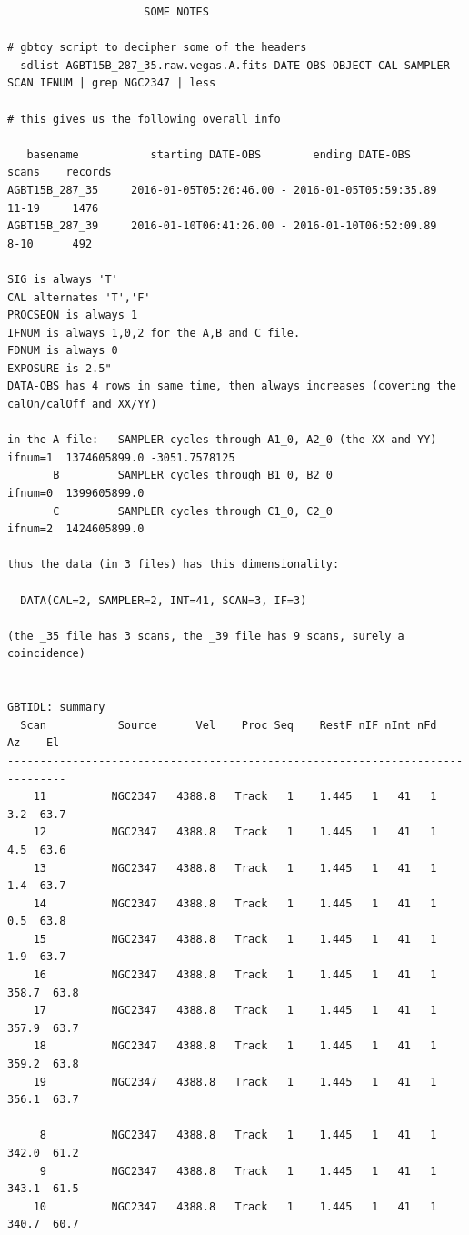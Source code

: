 \documentclass[12pt,a4paper]{article}
\begin{document}
\footnotesize
\begin{verbatim}
                     SOME NOTES
 
# gbtoy script to decipher some of the headers
  sdlist AGBT15B_287_35.raw.vegas.A.fits DATE-OBS OBJECT CAL SAMPLER SCAN IFNUM | grep NGC2347 | less

# this gives us the following overall info

   basename           starting DATE-OBS        ending DATE-OBS       scans    records
AGBT15B_287_35     2016-01-05T05:26:46.00 - 2016-01-05T05:59:35.89   11-19     1476
AGBT15B_287_39     2016-01-10T06:41:26.00 - 2016-01-10T06:52:09.89    8-10      492

SIG is always 'T'
CAL alternates 'T','F'
PROCSEQN is always 1
IFNUM is always 1,0,2 for the A,B and C file.
FDNUM is always 0
EXPOSURE is 2.5"
DATA-OBS has 4 rows in same time, then always increases (covering the calOn/calOff and XX/YY) 

in the A file:   SAMPLER cycles through A1_0, A2_0 (the XX and YY) - ifnum=1  1374605899.0 -3051.7578125
       B         SAMPLER cycles through B1_0, B2_0                   ifnum=0  1399605899.0
       C         SAMPLER cycles through C1_0, C2_0                   ifnum=2  1424605899.0

thus the data (in 3 files) has this dimensionality:

  DATA(CAL=2, SAMPLER=2, INT=41, SCAN=3, IF=3)

(the _35 file has 3 scans, the _39 file has 9 scans, surely a coincidence)


GBTIDL: summary
  Scan           Source      Vel    Proc Seq    RestF nIF nInt nFd     Az    El
-------------------------------------------------------------------------------
    11          NGC2347   4388.8   Track   1    1.445   1   41   1    3.2  63.7
    12          NGC2347   4388.8   Track   1    1.445   1   41   1    4.5  63.6
    13          NGC2347   4388.8   Track   1    1.445   1   41   1    1.4  63.7
    14          NGC2347   4388.8   Track   1    1.445   1   41   1    0.5  63.8
    15          NGC2347   4388.8   Track   1    1.445   1   41   1    1.9  63.7
    16          NGC2347   4388.8   Track   1    1.445   1   41   1  358.7  63.8
    17          NGC2347   4388.8   Track   1    1.445   1   41   1  357.9  63.7
    18          NGC2347   4388.8   Track   1    1.445   1   41   1  359.2  63.8
    19          NGC2347   4388.8   Track   1    1.445   1   41   1  356.1  63.7

     8          NGC2347   4388.8   Track   1    1.445   1   41   1  342.0  61.2
     9          NGC2347   4388.8   Track   1    1.445   1   41   1  343.1  61.5
    10          NGC2347   4388.8   Track   1    1.445   1   41   1  340.7  60.7


\end{verbatim}
\end{document}
